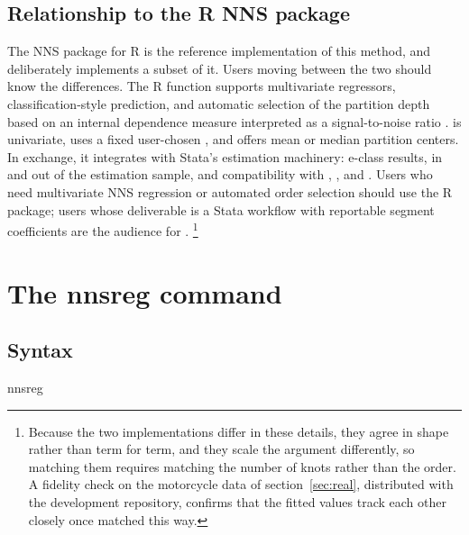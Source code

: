 \subsection{Relationship to the R NNS package}
\label{sec:rpackage}

The NNS package for R \citep{viole_2026_nns} is the reference implementation
of this method, and  deliberately implements a subset of it.
Users moving between the two should know the differences.  The R function
 supports multivariate regressors, classification-style
prediction, and automatic selection of the partition depth based on an
internal dependence measure interpreted as a signal-to-noise ratio
\citep{vinod_viole_2018_segments}.   is univariate, uses a
fixed user-chosen , and offers mean or median partition
centers.  In exchange, it integrates with Stata's estimation machinery:
e-class results,  in and out of the estimation sample, and
compatibility with , , and .
Users who need multivariate NNS regression or automated order selection
should use the R package; users whose deliverable is a Stata workflow with
reportable segment coefficients are the audience for .%
\footnote{Because the two implementations differ in these details, they agree
in shape rather than term for term, and they scale the 
argument differently, so matching them requires matching the number of knots
rather than the order.  A fidelity check on the motorcycle data of
section~\ref{sec:real}, distributed with the development repository, confirms
that the fitted values track each other closely once matched this way.}

\section{The nnsreg command}
\label{sec:command}

\subsection{Syntax}

\begin{stsyntax}
nnsreg
\depvar\
\varname\
\optif\
\optin\
\end{stsyntax}

